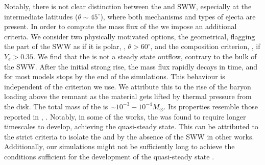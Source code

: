 Notably, there is not clear distinction between the \nwind{} and \ac{SWW}, especially 
at the intermediate latitudes ($\theta \sim 45^{\circ}$), where both mechanisms and 
types of ejecta are present.
%
In order to compute the mass flux of the \nwind{} we impose an additional criteria.
We consider two physically motivated options, the geometrical, flagging the part of the \ac{SWW} 
as \nwind{} if it is polar, \ie, $\theta>60^{\circ}$, and the composition criterion,
                                  \ie, if $Y_e > 0.35$.
%
We find that the \nwind{} is not a steady state outflow, contrary to the bulk of the \ac{SWW}.
After the initial strong rise, the mass flux rapidly decays in time, and for most models stops 
by the end of the simulations. This behaviour is independent of the criterion we use. 
We attribute this to the rise of the baryon loading above the remnant as the material gets lifted 
by thermal pressure from the disk.
The total mass of the \nwind{} is ${\sim}10^{-3}-10^{-4}M_{\odot}$. Its properties resemble those 
reported in \eg, \citet{Dessart:2008zd,Perego:2014fma,Fujibayashi:2020dvr}.
Notably, in some of the works, the \nwind{} was found to require longer timescales to develop, 
achieving the quasi-steady state. 
This can be attributed to the strict criteria to isolate the \nwind{} and by the absence of the 
\ac{SWW} in other works. 
Additionally, our simulations might not be sufficiently long to achieve the conditions 
sufficient for the development of the quasi-steady state \nwind{}.













